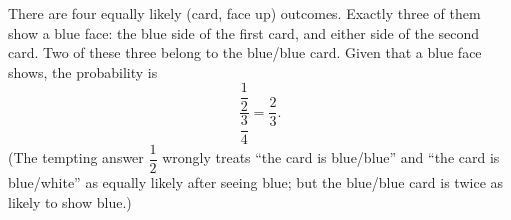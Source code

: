 There are four equally likely (card, face up) outcomes. Exactly three of them show a blue face: the blue side of the first card, and either side of the second card. Two of these three belong to the blue/blue card. Given that a blue face shows, the probability is
\[
\dfrac{\dfrac{1}{2}}{\dfrac{3}{4}}=\boxed{\dfrac{2}{3}}.
\]
(The tempting answer $\dfrac{1}{2}$ wrongly treats ``the card is blue/blue'' and ``the card is blue/white'' as equally likely after seeing blue; but the blue/blue card is twice as likely to show blue.)
